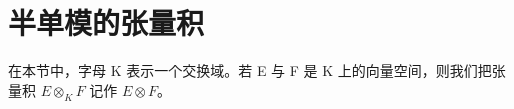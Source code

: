 \section{半单模的张量积}

在本节中，字母 K 表示一个交换域。若 E 与 F 是 K 上的向量空间，则我们把张量积 \(E \otimes_{K} F\) 记作 \(E \otimes F\)。

